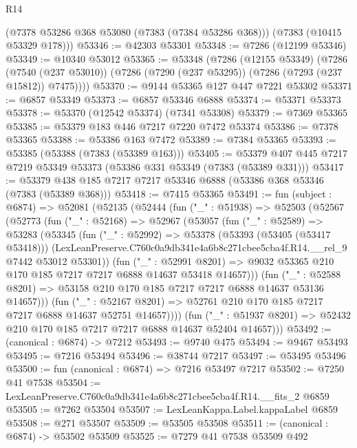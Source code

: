 \begin{lexlean}{R14}
\begin{coremodule}
      (@7378 @53286 @368 @53080 (@7383 (@7384 @53286 @368)))
      (@7383 (@10415 @53329 @178)))
@53346 := @42303 @53301
@53348 := @7286 (@12199 @53346)
@53349 := @10340 @53012
@53365 := @53348
    (@7286
      (@12155 @53349)
      (@7286
        (@7540 (@237 @53010))
        (@7286 (@7290 (@237 @53295)) (@7286 (@7293 (@237 @15812)) @7475))))
@53370 := @9144 @53365 @127 @447 @7221 @53302
@53371 := @6857 @53349
@53373 := @6857 @53346 @6888
@53374 := @53371 @53373
@53378 := @53370 (@12542 @53374) (@7341 @53308)
@53379 := @7369 @53365
@53385 := @53379 @183 @446 @7217 @7220 @7472 @53374
@53386 := @7378 @53365
@53388 := @53386 @163 @7472
@53389 := @7384 @53365
@53393 := @53385 (@53388 (@7383 (@53389 @163)))
@53405 := @53379 @407 @445 @7217 @7219 @53349 @53373 (@53386 @331 @53349 (@7383 (@53389 @331)))
@53417 := @53379 @438 @185 @7217 @7217 @53346 @6888 (@53386 @368 @53346 (@7383 (@53389 @368)))
@53418 := @7415 @53365
@53491 := fun (subject : @6874) =>
  @52081
    (@52135
      (@52444
        (fun ("_" : @51938) =>
        @52503
          (@52567
            (@52773
              (fun ("_" : @52168) =>
              @52967
                (@53057
                  (fun ("_" : @52589) =>
                  @53283
                    (@53345
                      (fun ("_" : @52992) =>
                      @53378
                        (@53393 (@53405 (@53417 @53418)))
                        (LexLeanPreserve.C760c0a9db341e4a6b8c271cbee5cba4f.R14.__rel_9
                          @7442
                          @53012
                          @53301))
                      (fun ("_" : @52991 @8201) =>
                      @9032 @53365 @210 @170 @185 @7217 @7217 @6888 @14637 @53418 @14657)))
                  (fun ("_" : @52588 @8201) =>
                  @53158 @210 @170 @185 @7217 @7217 @6888 @14637 @53136 @14657)))
              (fun ("_" : @52167 @8201) =>
              @52761 @210 @170 @185 @7217 @7217 @6888 @14637 @52751 @14657))))
        (fun ("_" : @51937 @8201) => @52432 @210 @170 @185 @7217 @7217 @6888 @14637 @52404 @14657)))
@53492 := (canonical : @6874) -> @7212
@53493 := @9740 @475
@53494 := @9467 @53493
@53495 := @7216 @53494
@53496 := @38744 @7217
@53497 := @53495 @53496
@53500 := fun (canonical : @6874) => @7216 @53497 @7217
@53502 := @7250 @41 @7538
@53504 := LexLeanPreserve.C760c0a9db341e4a6b8c271cbee5cba4f.R14.__fits_2 @6859
@53505 := @7262 @53504
@53507 := LexLeanKappa.Label.kappaLabel @6859
@53508 := @271 @53507
@53509 := @53505 @53508
@53511 := (canonical : @6874) -> @53502 @53509
@53525 := @7279
    @41
    @7538
    @53509
    @492

\end{coremodule}
\end{lexlean}
